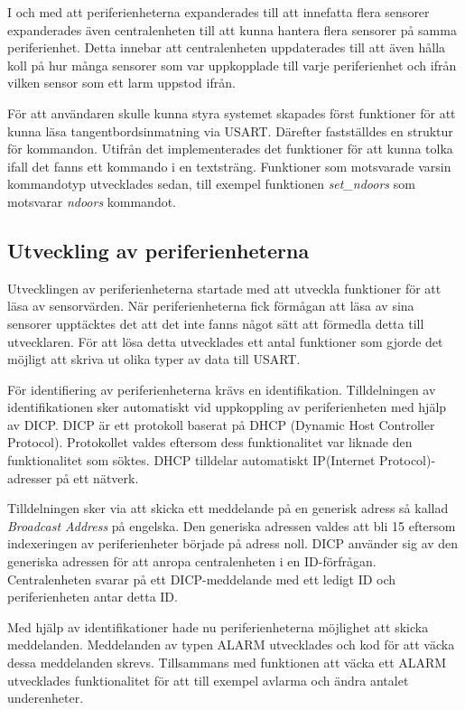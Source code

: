 \documentclass[a4paper]{article}
\begin{document}
I och med att periferienheterna expanderades till att innefatta flera sensorer expanderades även centralenheten till att kunna hantera flera sensorer på samma periferienhet.
Detta innebar att centralenheten uppdaterades till att även hålla koll på hur många sensorer som var uppkopplade till varje periferienhet och ifrån vilken sensor som ett larm uppstod ifrån.

För att användaren skulle kunna styra systemet skapades först funktioner för att kunna läsa tangentbordsinmatning via USART.
Därefter fastställdes en struktur för kommandon. Utifrån det implementerades det funktioner för att kunna tolka ifall det fanns ett kommando i en textsträng.
Funktioner som motsvarade varsin kommandotyp utvecklades sedan, till exempel funktionen \textit{set\_ndoors} som motsvarar \textit{ndoors} kommandot. 

\subsection{Utveckling av periferienheterna}
Utvecklingen av periferienheterna startade med att utveckla funktioner för att läsa av sensorvärden.
När periferienheterna fick förmågan att läsa av sina sensorer upptäcktes det att det inte fanns något sätt att förmedla detta till utvecklaren.
För att lösa detta utvecklades ett antal funktioner som gjorde det möjligt att skriva ut olika typer av data till USART.

För identifiering av periferienheterna krävs en identifikation.
Tilldelningen av identifikationen sker automatiskt vid uppkoppling av periferienheten med hjälp av DICP.
DICP är ett protokoll baserat på DHCP (Dynamic Host Controller Protocol).
Protokollet valdes eftersom dess funktionalitet var liknade den funktionalitet som söktes.
DHCP tilldelar automatiskt IP(Internet Protocol)-adresser på ett nätverk.

Tilldelningen sker via att skicka ett meddelande på en generisk adress så kallad \textit{Broadcast Address} på engelska.
Den generiska adressen valdes att bli 15 eftersom indexeringen av periferienheter började på adress noll.
DICP använder sig av den generiska adressen för att anropa centralenheten i en ID-förfrågan.
Centralenheten svarar på ett DICP-meddelande med ett ledigt ID och periferienheten antar detta ID.

Med hjälp av identifikationer hade nu periferienheterna möjlighet att skicka meddelanden.
Meddelanden av typen ALARM utvecklades och kod för att väcka dessa meddelanden skrevs.
Tillsammans med funktionen att väcka ett ALARM utvecklades funktionalitet för att till exempel avlarma och ändra antalet underenheter.
\end{document}
